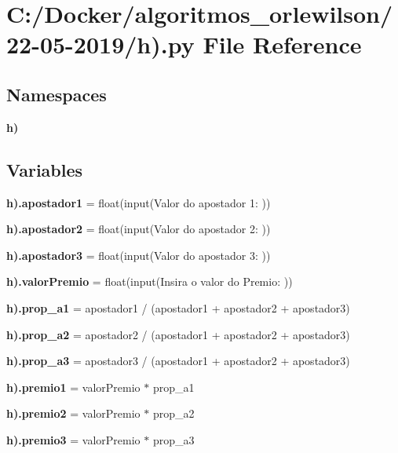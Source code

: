 \section{C\+:/\+Docker/algoritmos\+\_\+orlewilson/22-\/05-\/2019/h).py File Reference}
\label{h_08_8py}
\subsection*{Namespaces}
\begin{DoxyCompactItemize}
\item 
 \textbf{ h)}
\end{DoxyCompactItemize}
\subsection*{Variables}
\begin{DoxyCompactItemize}
\item 
\textbf{ h).\+apostador1} = float(input(\textquotesingle{}Valor do apostador 1\+: \textquotesingle{}))
\item 
\textbf{ h).\+apostador2} = float(input(\textquotesingle{}Valor do apostador 2\+: \textquotesingle{}))
\item 
\textbf{ h).\+apostador3} = float(input(\textquotesingle{}Valor do apostador 3\+: \textquotesingle{}))
\item 
\textbf{ h).\+valor\+Premio} = float(input(\textquotesingle{}Insira o valor do Premio\+: \textquotesingle{}))
\item 
\textbf{ h).\+prop\+\_\+a1} = apostador1 / (apostador1 + apostador2 + apostador3)
\item 
\textbf{ h).\+prop\+\_\+a2} = apostador2 / (apostador1 + apostador2 + apostador3)
\item 
\textbf{ h).\+prop\+\_\+a3} = apostador3 / (apostador1 + apostador2 + apostador3)
\item 
\textbf{ h).\+premio1} = valor\+Premio $\ast$ prop\+\_\+a1
\item 
\textbf{ h).\+premio2} = valor\+Premio $\ast$ prop\+\_\+a2
\item 
\textbf{ h).\+premio3} = valor\+Premio $\ast$ prop\+\_\+a3
\end{DoxyCompactItemize}

